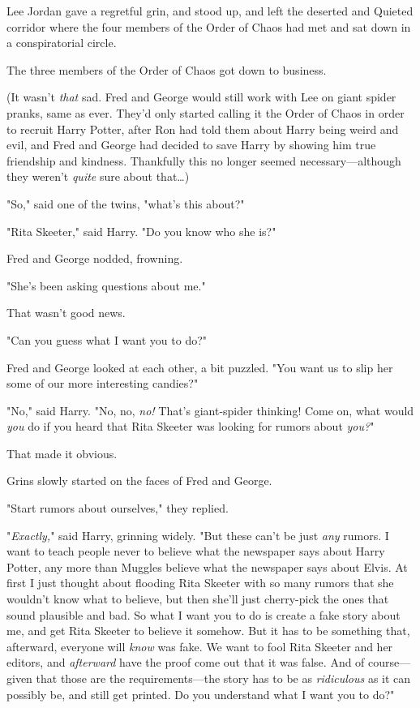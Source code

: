 Lee Jordan gave a regretful grin, and stood up, and left the deserted and 
Quieted corridor where the four members of the Order of Chaos had met and sat 
down in a conspiratorial circle.

The three members of the Order of Chaos got down to business.

(It wasn't \emph{that} sad. Fred and George would still work with Lee on giant 
spider pranks, same as ever. They'd only started calling it the Order of Chaos 
in order to recruit Harry Potter, after Ron had told them about Harry being 
weird and evil, and Fred and George had decided to save Harry by showing him 
true friendship and kindness. Thankfully this no longer seemed 
necessary---although they weren't \emph{quite} sure about that{\ldots})

"So," said one of the twins, "what's this about?"

"Rita Skeeter," said Harry. "Do you know who she is?"

Fred and George nodded, frowning.

"She's been asking questions about me."

That wasn't good news.

"Can you guess what I want you to do?"

Fred and George looked at each other, a bit puzzled. "You want us to slip her 
some of our more interesting candies?"

"No," said Harry. "No, no, \emph{no!} That's giant-spider thinking! Come on, 
what would \emph{you} do if you heard that Rita Skeeter was looking for rumors 
about \emph{you?}"

That made it obvious.

Grins slowly started on the faces of Fred and George.

"Start rumors about ourselves," they replied.

"\emph{Exactly,}" said Harry, grinning widely. "But these can't be just 
\emph{any} rumors. I want to teach people never to believe what the newspaper 
says about Harry Potter, any more than Muggles believe what the newspaper says 
about Elvis. At first I just thought about flooding Rita Skeeter with so many 
rumors that she wouldn't know what to believe, but then she'll just cherry-pick 
the ones that sound plausible and bad. So what I want you to do is create a 
fake story about me, and get Rita Skeeter to believe it somehow. But it has to 
be something that, afterward, everyone will \emph{know} was fake. We want to 
fool Rita Skeeter and her editors, and \emph{afterward} have the proof come out 
that it was false. And of course---given that those are the requirements---the 
story has to be as \emph{ridiculous} as it can possibly be, and still get 
printed. Do you understand what I want you to do?"

